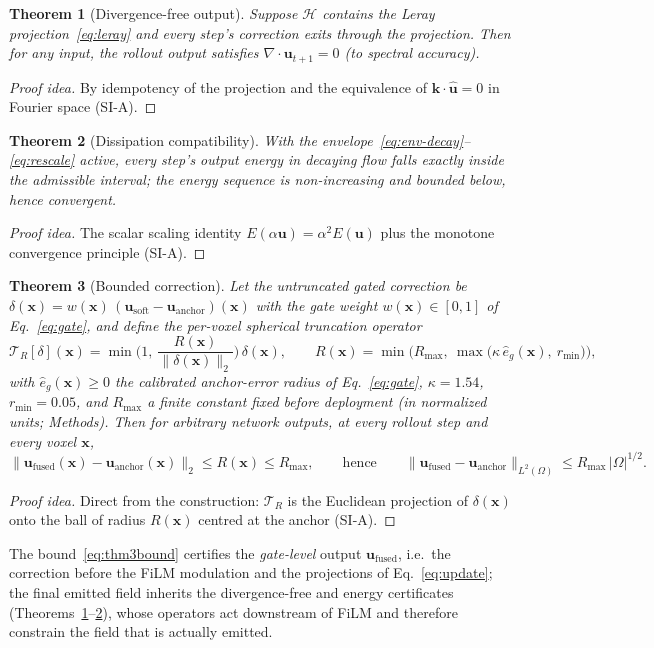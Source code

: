 \documentclass[11pt,a4paper]{article}
\newtheorem{theorem}{Theorem}
\newcommand{\bu}{\bm{u}}
\newcommand{\cH}{\mathcal{H}}
\newcommand{\Ex}{E}
\newcommand{\cT}{\mathcal{T}}
\begin{document}
\begin{theorem}[Divergence-free output]\label{thm:div}
Suppose $\cH$ contains the Leray projection~\eqref{eq:leray} and every step's correction exits through the projection. Then for any input, the rollout output satisfies $\nabla\!\cdot\!\bu_{t+1}=0$ (to spectral accuracy).
\end{theorem}
\begin{proof}[Proof idea]
By idempotency of the projection and the equivalence of $\bm{k}\cdot\widehat{\bu}=0$ in Fourier space (SI-A).
\end{proof}

\begin{theorem}[Dissipation compatibility]\label{thm:energy}
With the envelope~\eqref{eq:env-decay}--\eqref{eq:rescale} active, every step's output energy in decaying flow falls exactly inside the admissible interval; the energy sequence is non-increasing and bounded below, hence convergent.
\end{theorem}
\begin{proof}[Proof idea]
The scalar scaling identity $\Ex(\alpha\bu)=\alpha^2\Ex(\bu)$ plus the monotone convergence principle (SI-A).
\end{proof}

\begin{theorem}[Bounded correction]\label{thm:gate}
Let the untruncated gated correction be $\delta(\bm{x})=w(\bm{x})\,(\bu_{\mathrm{soft}}-\bu_{\mathrm{anchor}})(\bm{x})$ with the gate weight $w(\bm{x})\in[0,1]$ of Eq.~\eqref{eq:gate}, and define the per-voxel spherical truncation operator
\begin{equation}
\cT_R[\delta](\bm{x})=\min\!\Big(1,\ \frac{R(\bm{x})}{\|\delta(\bm{x})\|_2}\Big)\,\delta(\bm{x}),\qquad
R(\bm{x})=\min\!\Big(R_{\max},\ \max\big(\kappa\,\hat e_g(\bm{x}),\ r_{\min}\big)\Big),
\label{eq:trunc}
\end{equation}
with $\hat e_g(\bm{x})\ge0$ the calibrated anchor-error radius of Eq.~\eqref{eq:gate}, $\kappa=1.54$, $r_{\min}=0.05$, and $R_{\max}$ a finite constant fixed before deployment (in normalized units; Methods). Then for \emph{arbitrary} network outputs, at every rollout step and every voxel $\bm{x}$,
\begin{equation}
\big\|\bu_{\mathrm{fused}}(\bm{x})-\bu_{\mathrm{anchor}}(\bm{x})\big\|_2\le R(\bm{x})\le R_{\max},
\qquad\text{hence}\qquad
\big\|\bu_{\mathrm{fused}}-\bu_{\mathrm{anchor}}\big\|_{L^2(\Omega)}\le R_{\max}\,|\Omega|^{1/2}.
\label{eq:thm3bound}
\end{equation}
\end{theorem}
\begin{proof}[Proof idea]
Direct from the construction: $\cT_R$ is the Euclidean projection of $\delta(\bm{x})$ onto the ball of radius $R(\bm{x})$ centred at the anchor (SI-A).
\end{proof}
The bound~\eqref{eq:thm3bound} certifies the \emph{gate-level} output $\bu_{\mathrm{fused}}$, i.e.\ the correction before the FiLM modulation and the projections of Eq.~\eqref{eq:update}; the final emitted field inherits the divergence-free and energy certificates (Theorems~\ref{thm:div}--\ref{thm:energy}), whose operators act downstream of FiLM and therefore constrain the field that is actually emitted.
\end{document}
